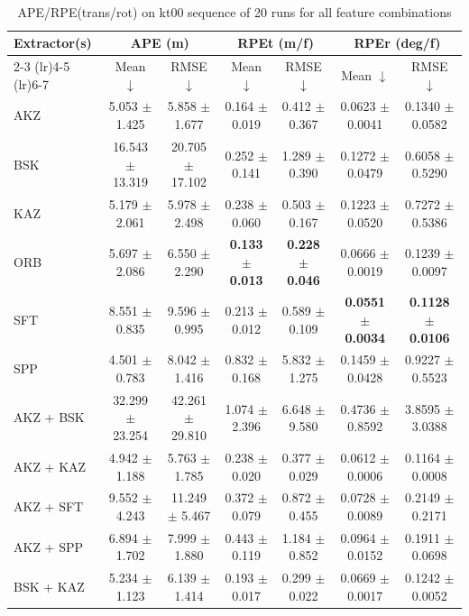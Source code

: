 \begin{table}[hbp]
\centering
\caption{APE/RPE(trans/rot) on kt00 sequence of 20 runs for all feature combinations}
\scriptsize
\label{tab:kt00_ape_rpe}\
\setlength{\tabcolsep}{3pt}
\begin{tabular}{lcccccc}
\toprule
\textbf{Extractor(s)}
& \multicolumn{2}{c}{\textbf{APE (m)}}
& \multicolumn{2}{c}{\textbf{RPEt (m/f)}}
& \multicolumn{2}{c}{\textbf{RPEr (deg/f)}} \\
\cmidrule(lr){2-3} \cmidrule(lr){4-5} \cmidrule(lr){6-7}
& Mean $\downarrow$ & RMSE $\downarrow$
& Mean $\downarrow$ & RMSE $\downarrow$
& Mean $\downarrow$ & RMSE $\downarrow$ \\
\midrule
AKZ & 5.053 $\pm$ 1.425 & 5.858 $\pm$ 1.677 & 0.164 $\pm$ 0.019 & 0.412 $\pm$ 0.367 & 0.0623 $\pm$ 0.0041 & 0.1340 $\pm$ 0.0582 \\
BSK & 16.543 $\pm$ 13.319 & 20.705 $\pm$ 17.102 & 0.252 $\pm$ 0.141 & 1.289 $\pm$ 0.390 & 0.1272 $\pm$ 0.0479 & 0.6058 $\pm$ 0.5290 \\
KAZ & 5.179 $\pm$ 2.061 & 5.978 $\pm$ 2.498 & 0.238 $\pm$ 0.060 & 0.503 $\pm$ 0.167 & 0.1223 $\pm$ 0.0520 & 0.7272 $\pm$ 0.5386 \\
ORB & 5.697 $\pm$ 2.086 & 6.550 $\pm$ 2.290 & \textbf{0.133 $\pm$ 0.013} & \textbf{0.228 $\pm$ 0.046} & 0.0666 $\pm$ 0.0019 & 0.1239 $\pm$ 0.0097 \\
SFT & 8.551 $\pm$ 0.835 & 9.596 $\pm$ 0.995 & 0.213 $\pm$ 0.012 & 0.589 $\pm$ 0.109 & \textbf{0.0551 $\pm$ 0.0034} & \textbf{0.1128 $\pm$ 0.0106} \\
SPP & 4.501 $\pm$ 0.783 & 8.042 $\pm$ 1.416 & 0.832 $\pm$ 0.168 & 5.832 $\pm$ 1.275 & 0.1459 $\pm$ 0.0428 & 0.9227 $\pm$ 0.5523 \\
AKZ + BSK & 32.299 $\pm$ 23.254 & 42.261 $\pm$ 29.810 & 1.074 $\pm$ 2.396 & 6.648 $\pm$ 9.580 & 0.4736 $\pm$ 0.8592 & 3.8595 $\pm$ 3.0388 \\
AKZ + KAZ & 4.942 $\pm$ 1.188 & 5.763 $\pm$ 1.785 & 0.238 $\pm$ 0.020 & 0.377 $\pm$ 0.029 & 0.0612 $\pm$ 0.0006 & 0.1164 $\pm$ 0.0008 \\
AKZ + SFT & 9.552 $\pm$ 4.243 & 11.249 $\pm$ 5.467 & 0.372 $\pm$ 0.079 & 0.872 $\pm$ 0.455 & 0.0728 $\pm$ 0.0089 & 0.2149 $\pm$ 0.2171 \\
AKZ + SPP & 6.894 $\pm$ 1.702 & 7.999 $\pm$ 1.880 & 0.443 $\pm$ 0.119 & 1.184 $\pm$ 0.852 & 0.0964 $\pm$ 0.0152 & 0.1911 $\pm$ 0.0698 \\
BSK + KAZ & 5.234 $\pm$ 1.123 & 6.139 $\pm$ 1.414 & 0.193 $\pm$ 0.017 & 0.299 $\pm$ 0.022 & 0.0669 $\pm$ 0.0017 & 0.1242 $\pm$ 0.0052 \\

\end{tabular}
\end{table}
